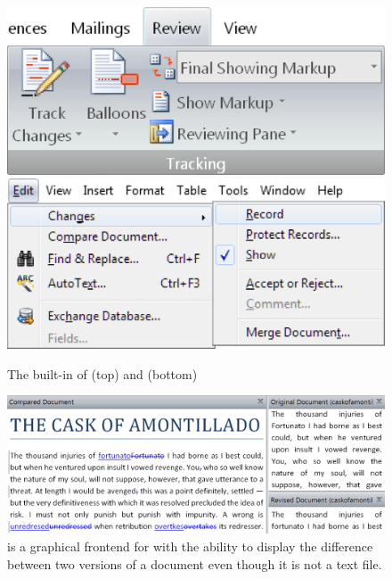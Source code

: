 \begin{figure}
  \includegraphics[width=\textwidth]{examples/01/word.png}\nextimage
  \includegraphics[width=\textwidth]{examples/01/openoffice.png}
  \caption{The built-in  of  (top) and
     (bottom)}
\end{figure}

\begin{figure}
  \includegraphics[width=\textwidth]{examples/01/tortoise-svn.png}
  \caption{ is a graphical frontend for
     with the ability to display the difference between two versions
    of a  document even though it is not a text file.}
\end{figure}

